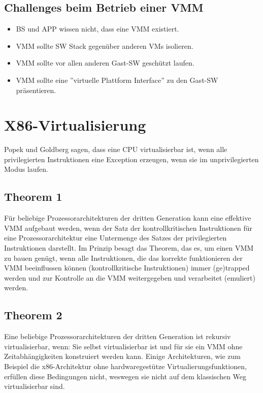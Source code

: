 \subsection{Challenges beim Betrieb einer VMM}
\begin{itemize}
	\item BS und APP wissen nicht, dass eine VMM existiert.
	\item VMM sollte SW Stack gegenüber anderen VMs isolieren.
	\item VMM sollte vor allen anderen Gast-SW geschützt laufen.
	\item VMM sollte eine ''virtuelle Plattform Interface'' zu den Gast-SW präsentieren.
\end{itemize}

\newpage
\section{X86-Virtualisierung}
Popek und Goldberg sagen, dass eine CPU virtualisierbar ist, wenn alle privilegierten Instruktionen eine Exception erzeugen, wenn sie im unprivilegierten Modus laufen.

\subsection{Theorem 1}
\label{sec:poppek-goldberg-theorem1}
Für beliebige Prozessorarchitekturen der dritten Generation kann
eine effektive VMM aufgebaut werden, wenn der Satz der
kontrollkritischen Instruktionen für eine Prozessorarchitektur
eine Untermenge des Satzes der privilegierten Instruktionen
darstellt.
Im Prinzip besagt das Theorem, das es, um einen VMM zu bauen
genügt, wenn alle Instruktionen, die das korrekte funktionieren
der VMM beeinflussen können (kontrollkritische Instruktionen)
immer (ge)trapped werden und zur Kontrolle an die VMM
weitergegeben und verarbeitet (emuliert) werden.

\subsection{Theorem 2}
Eine beliebige Prozessorarchitekturen der dritten Generation ist
rekursiv virtualisierbar, wenn: Sie selbst virtualisierbar ist und für sie ein VMM ohne Zeitabhängigkeiten konstruiert werden
kann.
Einige Architekturen, wie zum Beispiel die x86-Architektur ohne
hardwaregestütze Virtualierungsfunktionen, erfüllen diese
Bedingungen nicht, weswegen sie nicht auf dem klassischen Weg
virtualisierbar sind.

